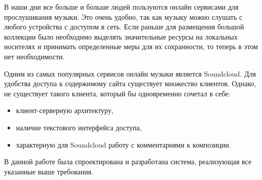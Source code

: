 В наши дни все больше и больше людей пользуются онлайн сервисами для
прослушивания музыки. Это очень удобно, так как музыку можно слушать с
любого устройства  с доступом в сеть. Если раньше для размещения
большой коллекции было необходимо выделять значительные ресурсы на
локальных носителях и принимать определенные меры для их сохранности,
то теперь в этом нет необходимости. 

Одним из самых популярных сервисов онлайн музыки является
Soundcloud\cite{soundcloud:main}. Для удобства доступа к содержимому
сайта существует множество  клиентов. Однако, не существует такого
клиента, который бы одновременно сочетал в себе:

\begin{itemize}
\item {клиент-серверную архитектуру, }
\item {наличие текстового интерфейса доступа, }  
\item {характерную для Soundcloud работу с комментариями к композиции.}
\end{itemize}

В данной работе была спроектирована и разработана система, реализующая
все указанные выше требования. 



